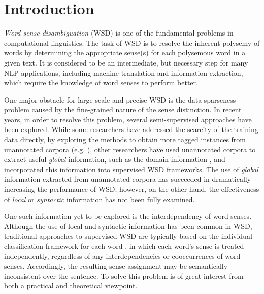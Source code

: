 \documentclass[english]{jnlp_1.4}
\begin{document}
\maketitle

\section{Introduction}
\label{section:introduction}


\textit{Word sense disambiguation} (WSD) is one of the fundamental problems in computational linguistics.
The task of WSD is to resolve the inherent polysemy of words by determining the appropriate sense(s) for each polysemous word in a given text.
It is considered to be an intermediate, but necessary step for many NLP applications, including machine translation and information extraction, which require the knowledge of word senses to perform better.


One major obstacle for large-scale and precise WSD is the data sparseness problem caused by the fine-grained nature of the sense distinction.
In recent years, in order to resolve this problem, several semi-supervised approaches have been explored.
While some researchers have addressed the scarcity of the training data directly, by exploring the methods to obtain more tagged instances from unannotated corpora (e.g. \cite{mihalcea:2004:co-training}),
other researchers have used unannotated corpora to extract useful \textit{global} information, such as the domain information \cite{gliozzo:2005,graber:2007}, and incorporated this information into supervised WSD frameworks.
The use of \textit{global} information extracted from unannotated corpora has succeeded in dramatically increasing the performance of WSD;
however, on the other hand, the effectiveness of \textit{local} or \textit{syntactic} information has not been fully examined.


One such information yet to be explored is the interdependency of word senses.
Although the use of local and syntactic information has been common in WSD, traditional approaches to supervised WSD are typically based on the individual classification framework for each word \cite{hoste:2002,decadt:2004}, in which each word's sense is treated independently, regardless of any interdependencies or cooccurrences of word senses.
Accordingly, the resulting sense assignment may be semantically inconsistent over the sentence.
To solve this problem is of great interest from both a practical and theoretical viewpoint.
\end{document}
